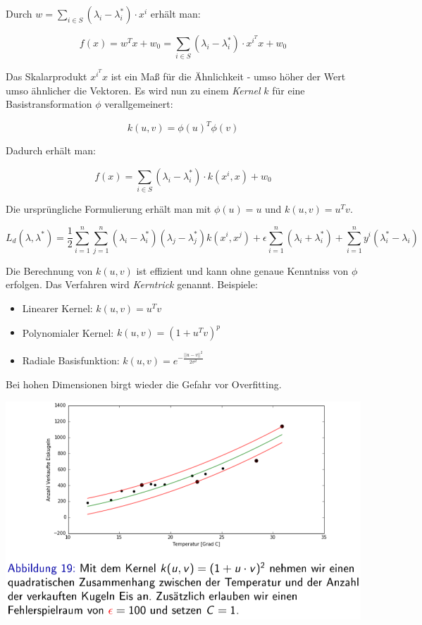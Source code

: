 \documentclass{report}
\begin{document}
  Durch $w = \sum_{i\in S}(\lambda_i - \lambda_i^*)\cdot x^i$ erhält man:	
  
  $$f(x) = w^Tx + w_0 = \sum_{i\in S}(\lambda_i - \lambda_i^*)\cdot x^{i^T}x + w_0$$	
  
  Das Skalarprodukt $x^{i^T}x$ ist ein Maß für die Ähnlichkeit - umso höher der Wert umso ähnlicher die Vektoren.	
  Es wird nun zu einem \textit{Kernel} $k$ für eine Basistransformation $\phi$ verallgemeinert:	
  
  $$k(u, v) = \phi(u)^T\phi(v)$$	
  
  Dadurch erhält man:	
  
  $$f(x) = \sum_{i\in S}(\lambda_i - \lambda_i^*)\cdot k(x^i, x) + w_0$$	
  
  Die ursprüngliche Formulierung erhält man mit $\phi(u) = u$ und $k(u, v) = u^Tv$.	
  
  $$L_d(\lambda, \lambda^*) = \frac{1}{2}\sum_{i=1}^n\sum_{j=1}^n(\lambda_i - \lambda_i^*)(\lambda_j - \lambda_j^*)	
  k(x^i, x^j) + \epsilon\sum_{i=1}^n(\lambda_i + \lambda_i^*) + \sum_{i=1}^ny^i(\lambda_i^* - \lambda_i)$$	
  
  Die Berechnung von $k(u, v)$ ist effizient und kann ohne genaue Kenntniss von $\phi$ erfolgen.	
  Das Verfahren wird \textit{Kerntrick} genannt. Beispiele:\\	
  \vspace*{-1.5em}	
  \begin{itemize}	
    \item Linearer Kernel: $k(u, v) = u^Tv$	
    \item Polynomialer Kernel: $k(u, v) = (1 + u^Tv)^p$	
    \item Radiale Basisfunktion: $k(u, v) = e^{-\frac{||u-v||^2}{2\sigma^2}}$	
  \end{itemize}	
  
  Bei hohen Dimensionen birgt wieder die Gefahr vor Overfitting.	
  
  \begin{center}	
    \includegraphics[scale=.295]{ml06_19}	
  \end{center}	
  
\end{document}
